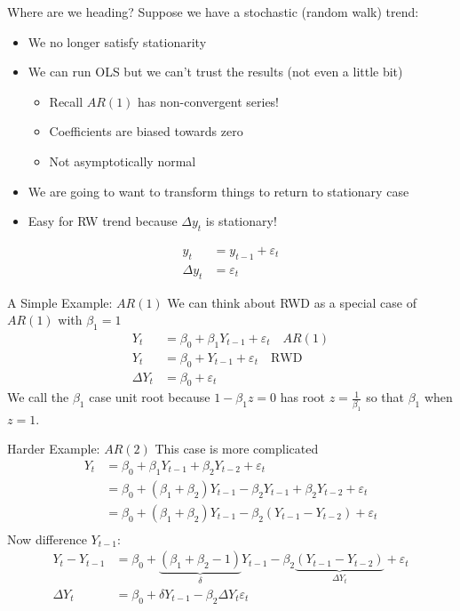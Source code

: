 \documentclass[aspectratio=169]{beamer}
\begin{document}
\begin{frame}{Where are we heading?}
Suppose we have a stochastic (random walk) trend:
\begin{itemize}
\item We no longer satisfy \alert{stationarity}
\item We can run OLS but we can't trust the results (not even a little bit)
\begin{itemize}
    \item Recall $AR(1)$ has non-convergent series!
    \item Coefficients are biased towards zero
    \item Not asymptotically normal
\end{itemize}
\item We are going to want to transform things to return to stationary case
\item Easy for RW trend because $\Delta y_t$ is stationary!
\end{itemize}
\begin{align*}
y_t &= y_{t-1} + \varepsilon_t \\
\Delta y_t &= \varepsilon_t
\end{align*}
\end{frame}


\begin{frame}{A Simple Example: $AR(1)$}
We can think about RWD as a special case of $AR(1)$ with $\beta_1=1$
\begin{align*}
Y_t  &= \beta_0 +\beta_1 Y_{t-1} + \varepsilon_t \quad AR(1)\\
Y_t  &= \beta_0 + Y_{t-1} + \varepsilon_t \quad  \text{RWD} \\
\Delta Y_t  &= \beta_0 + \varepsilon_t 
\end{align*}
We call the $\beta_1$ case \alert{unit root} because $1 - \beta_1 z=0$ has root $z = \frac{1}{\beta_1}$ so that $\beta_1$ when $z=1$.
\end{frame}

\begin{frame}{Harder Example: $AR(2)$}
This case is more complicated
\begin{align*}
Y_t &= \beta_0 + \beta_1 Y_{t-1} + \beta_2 Y_{t-2} + \varepsilon_t\\
    &= \beta_0 + (\beta_1 + \beta_2) Y_{t-1} - \beta_2 Y_{t-1} +  \beta_2 Y_{t-2} + \varepsilon_t\\
    &= \beta_0 + (\beta_1 + \beta_2) Y_{t-1} - \beta_2(Y_{t-1} - Y_{t-2})+ \varepsilon_t\\
\end{align*}
Now difference $Y_{t-1}$:
\begin{align*}
Y_t -Y_{t-1}&= \beta_0 + \underbrace{(\beta_1 + \beta_2 -1)}_{\delta} Y_{t-1} - \beta_2 \underbrace{(Y_{t-1} - Y_{t-2})}_{\Delta Y_t}+ \varepsilon_t\\
\Delta Y_t &= \beta_0 + \delta Y_{t-1} - \beta_2 \Delta Y_t  \varepsilon_t\\
\end{align*}
\end{frame}
\end{document}
